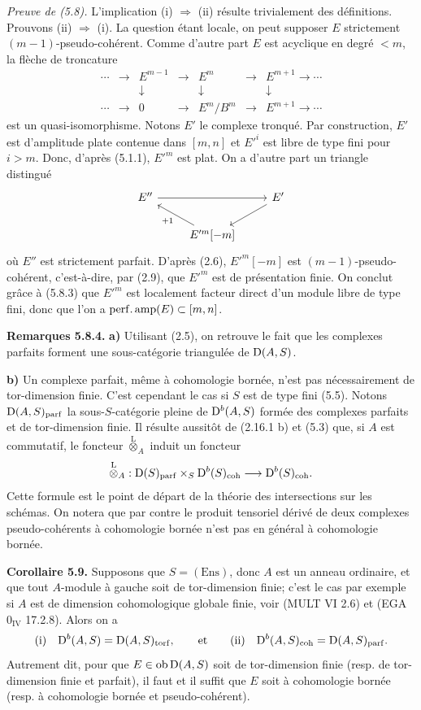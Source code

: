 \documentclass[11pt]{article}
\begin{document}
\emph{Preuve de (5.8).} L'implication (i) \(\Rightarrow\) (ii) résulte trivialement des définitions. Prouvons (ii) \(\Rightarrow\) (i). La question étant locale, on peut supposer \(E\) strictement \((m-1)\)-pseudo-cohérent. Comme d'autre part \(E\) est acyclique en degré \(<m\), la flèche de troncature
\[
\begin{array}{ccccccc}
\cdots&\to&E^{m-1}&\to&E^m&\to&E^{m+1}\to\cdots\\
&&\downarrow&&\downarrow&&\downarrow\\
\cdots&\to&0&\to&E^m/B^m&\to&E^{m+1}\to\cdots
\end{array}
\]
est un quasi-isomorphisme. Notons \(E'\) le complexe tronqué. Par construction, \(E'\) est d'amplitude plate contenue dans \([m,n]\) et \(E'^i\) est libre de type fini pour \(i>m\). Donc, d'après (5.1.1), \(E'^m\) est plat. On a d'autre part un triangle distingué
\[
\begin{tikzcd}
E'' \arrow[rr] && E' \arrow[dl]\\
& E'^m[-m] \arrow[ul,"+1"] &
\end{tikzcd}
\]
où \(E''\) est strictement parfait. D'après (2.6), \(E'^m[-m]\) est \((m-1)\)-pseudo-cohérent, c'est-à-dire, par (2.9), que \(E'^m\) est de présentation finie. On conclut grâce à (5.8.3) que \(E'^m\) est localement facteur direct d'un module libre de type fini, donc que l'on a \(\operatorname{perf.amp}(E)\subset[m,n]\).

\textbf{Remarques 5.8.4.} \textbf{a)} Utilisant (2.5), on retrouve le fait que les complexes parfaits forment une sous-catégorie triangulée de \(\mathrm D(A,S)\).

\textbf{b)} Un complexe parfait, même à cohomologie bornée, n'est pas nécessairement de tor-dimension finie. C'est cependant le cas si \(S\) est de type fini (5.5). Notons \(\mathrm D(A,S)_{\mathrm{parf}}\) la sous-\(S\)-catégorie pleine de \(\mathrm D^b(A,S)\) formée des complexes parfaits et de tor-dimension finie. Il résulte aussitôt de (2.16.1 b) et (5.3) que, si \(A\) est commutatif, le foncteur \(\overset{\mathrm L}{\otimes}_A\) induit un foncteur
\[
  \overset{\mathrm L}{\otimes}_A:
  \mathrm D(S)_{\mathrm{parf}}\times_S \mathrm D^b(S)_{\mathrm{coh}}
  \longrightarrow \mathrm D^b(S)_{\mathrm{coh}}.
\]
Cette formule est le point de départ de la théorie des intersections sur les schémas. On notera que par contre le produit tensoriel dérivé de deux complexes pseudo-cohérents à cohomologie bornée n'est pas en général à cohomologie bornée.

\textbf{Corollaire 5.9.} Supposons que \(S=(\mathrm{Ens})\), donc \(A\) est un anneau ordinaire, et que tout \(A\)-module à gauche soit de tor-dimension finie; c'est le cas par exemple si \(A\) est de dimension cohomologique globale finie, voir (MULT VI 2.6) et (EGA \(0_{\mathrm{IV}}\) 17.2.8). Alors on a
\[
\text{(i)}\quad \mathrm D^b(A,S)=\mathrm D(A,S)_{\operatorname{torf}},
\qquad
\text{et}
\qquad
\text{(ii)}\quad \mathrm D^b(A,S)_{\mathrm{coh}}=\mathrm D(A,S)_{\mathrm{parf}}.
\]
Autrement dit, pour que \(E\in\operatorname{ob}\mathrm D(A,S)\) soit de tor-dimension finie (resp. de tor-dimension finie et parfait), il faut et il suffit que \(E\) soit à cohomologie bornée (resp. à cohomologie bornée et pseudo-cohérent).
\end{document}

